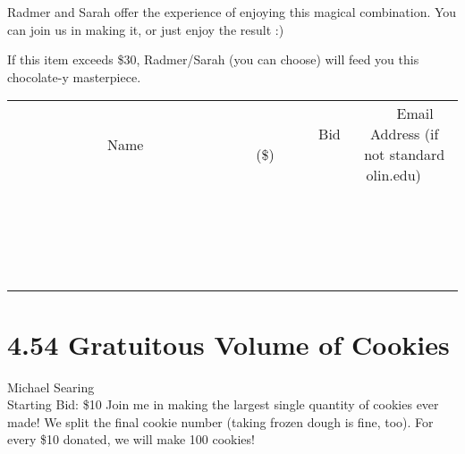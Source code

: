 \documentclass[11pt]{article}
\begin{document}
Radmer and Sarah offer the experience of enjoying this magical combination. You can join us in making it, or just enjoy the result :) 

If this item exceeds \$30, Radmer/Sarah (you can choose) will feed you this chocolate-y masterpiece.
\\[3ex]
\begin{tabular}{c c c}
~~~~~~~~~~~~~Name~~~~~~~~~~~~~ & ~~~~~~~~~Bid (\$)~~~~~~~~~  & ~~~Email Address (if not standard olin.edu)~~~\\
 & & \\
\hline
 & & \\
\hline
 & & \\
\hline
 & & \\
\hline
 & & \\
\hline
 & & \\
\hline
 & & \\
\hline
 & & \\
\hline
 & & \\
\hline
 & & \\
\hline
 & & \\
\hline
 & & \\
\hline
 & & \\
\hline
 & & \\
\hline
 & & \\
\hline
 & & \\
\hline
 & & \\
\hline
 & & \\
\hline
 & & \\
\hline
\end{tabular}
\newpage
\section*{4.54 Gratuitous Volume of Cookies}
Michael Searing
\\
Starting Bid: \$10
\newline
Join me in making the largest single quantity of cookies ever made!  We split the final cookie number (taking frozen dough is fine, too).  For every \$10 donated, we will make 100 cookies!
\end{document}
